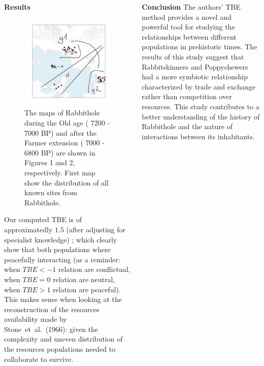 \documentclass[final]{beamer}
\begin{document}
\begin{frame}[t]
\begin{columns}[t]
\begin{block}{\textbf{Results}}
            \begin{figure}
                \label{fig:twomaps}
                \centering
                \includegraphics[width=.4\textwidth]{all_gpe}
                \caption{The maps of Rabbithole during the Old age ( 7200 - 7000 BP) and after the Farmer extension ( 7000 - 6800 BP) are shown in Figures 1 and 2, respectively. First map show the distribution of all known sites from Rabbithole.}
            \end{figure}

            Our computed TBE is of approximatedly $1.5$ (after adjusting for specialist knowledge) ; which clearly show that both populations where peacefully interacting (as a reminder: when $TBE< -1$  relation are conflictual, when  $TBE = 0$  relation are neutral, when $TBE > 1$ relation are peaceful). This makes sense when looking at the reconstruction of the resources availability made by Stone~et~al.~(1966): given the complexity and uneven distribution of the resources populations needed to collaborate to survive. 

        \end{block}

    \begin{block}{\textbf{Conclusion}}
            The authors' TBE method provides a novel and powerful tool for studying the relationships between different populations in prehistoric times. The results of this study suggest that Rabbitskinners and Poppychewers had a more symbiotic relationship characterized by trade and exchange rather than competition over resources. This study contributes to a better understanding of the history of Rabbithole and the nature of interactions between its inhabitants.
        \end{block}


\end{columns}
\end{frame}
\end{document}
